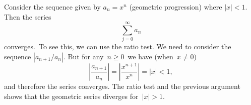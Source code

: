 \documentclass[12pt]{article}
\begin{document}
Consider the sequence given by $a_n=x^n$ (geometric progression) where  $|x|<1$.
Then the series
\[
\sum_{j=0}^\infty a_n 
\]
converges. \,To see this, we can use the ratio test. We need to consider the sequence  $|a_{n+1}/a_n|$. But for any \,$n \ge 0$\, we have (when \,$x \neq 0$)
\[
\left|\frac{a_{n+1}}{a_n}\right| = \left|\frac{x^{n+1}}{x^n}\right| = |x| < 1,
\]
and therefore the series converges. The ratio test and the previous argument shows that the geometric series diverges for \,$|x|>1$.
\end{document}
